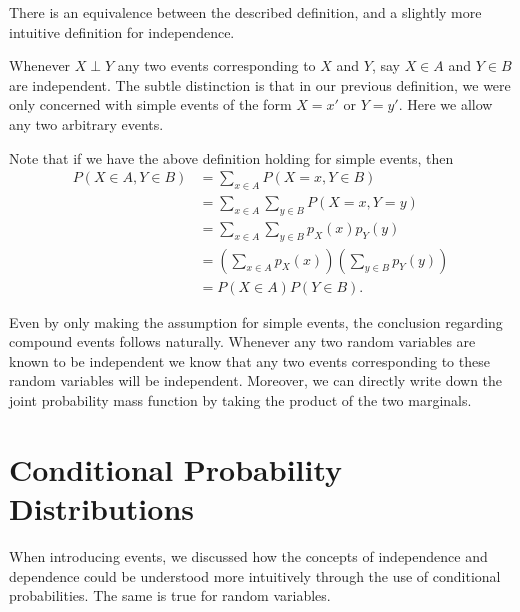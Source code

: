 \documentclass[
  letterpaper,
  DIV=11,
  numbers=noendperiod]{scrreprt}
\theoremstyle{definition}
\theoremstyle{definition}
\theoremstyle{definition}
\theoremstyle{remark}
\begin{document}
\begin{tcolorbox}[enhanced jigsaw, rightrule=.15mm, leftrule=.75mm, opacitybacktitle=0.6, title={Equivalent Definition of Independence}, colframe=quarto-callout-warning-color-frame, opacityback=0, coltitle=black, breakable, toptitle=1mm, colbacktitle=quarto-callout-warning-color!10!white, bottomtitle=1mm, titlerule=0mm, arc=.35mm, colback=white, toprule=.15mm, left=2mm, bottomrule=.15mm]

There is an equivalence between the described definition, and a slightly
more intuitive definition for independence.

Whenever \(X\perp Y\) any two events corresponding to \(X\) and \(Y\),
say \(X \in A\) and \(Y \in B\) are independent. The subtle distinction
is that in our previous definition, we were only concerned with simple
events of the form \(X=x'\) or \(Y=y'\). Here we allow any two arbitrary
events.

Note that if we have the above definition holding for simple events,
then \begin{align*}
P(X \in A, Y \in B) &= \sum_{x\in A}P(X=x,Y\in B) \\
&= \sum_{x\in A}\sum_{y \in B} P(X=x,Y=y)\\
&= \sum_{x\in A}\sum_{y \in B} p_X(x)p_Y(y) \\
&= \left(\sum_{x\in A}p_X(x)\right)\left(\sum_{y\in B}p_Y(y)\right)\\
&= P(X\in A)P(Y\in B).
\end{align*}

Even by only making the assumption for simple events, the conclusion
regarding compound events follows naturally. Whenever any two random
variables are known to be independent we know that any two events
corresponding to these random variables will be independent. Moreover,
we can directly write down the joint probability mass function by taking
the product of the two marginals.

\end{tcolorbox}

\section{Conditional Probability
Distributions}\label{conditional-probability-distributions}

When introducing events, we discussed how the concepts of independence
and dependence could be understood more intuitively through the use of
conditional probabilities. The same is true for random variables.
\end{document}
